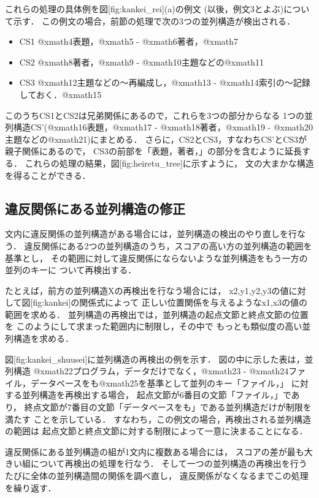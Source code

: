 これらの処理の具体例を図[fig:kankei_rei](a)の例文
(以後，例文3とよぶ)について示す．
この例文の場合，前節の処理で次の3つの並列構造が検出される．
\begin{itemize}
  \item CS1 @xmath4表題，@xmath5 - @xmath6著者，@xmath7
  \item CS2 @xmath8著者，@xmath9 - @xmath10主題などの@xmath11
  \item CS3 @xmath12主題などの〜再編成し，@xmath13 - @xmath14索引の〜記録しておく．@xmath15\
\end{itemize}
このうちCS1とCS2は兄弟関係にあるので，これらを3つの部分からなる
1つの並列構造CS'(@xmath16表題，@xmath17 - @xmath18著者，@xmath19 - @xmath20主題などの@xmath21)にまとめる．
さらに，CS2とCS3，すなわちCS'とCS3が親子関係にあるので，
CS3の前部を「表題，著者，」の部分を含むように延長する．
これらの処理の結果，図[fig:heiretu_tree]に示すように，
文の大まかな構造を得ることができる．

\subsection{違反関係にある並列構造の修正}

文内に違反関係の並列構造がある場合には，並列構造の検出のやり直しを行なう．
違反関係にある2つの並列構造のうち，スコアの高い方の並列構造の範囲を基準とし，
その範囲に対して違反関係にならないような並列構造をもう一方の並列のキーに
ついて再検出する．

{\unitlength=1mm
}

たとえば，前方の並列構造Xの再検出を行なう場合には，
x2,y1,y2,y3の値に対して図[fig:kankei]の関係式によって
正しい位置関係を与えるようなx1,x3の値の範囲を求める．
並列構造の再検出では，並列構造の起点文節と終点文節の位置を
このようにして求まった範囲内に制限し，その中で
もっとも類似度の高い並列構造を求める．

図[fig:kankei_shuusei]に並列構造の再検出の例を示す．
図の中に示した表は，並列構造 @xmath22プログラム，データだけでなく，@xmath23 - 
@xmath24ファイル，データベースをも@xmath25を基準として並列のキー「ファイル，」
に対する並列構造を再検出する場合，
起点文節が6番目の文節「ファイル，」であり，
終点文節が7番目の文節「データベースをも」である並列構造だけが制限を満たす
ことを示している．
すなわち，この例文の場合，再検出される並列構造の範囲は
起点文節と終点文節に対する制限によって一意に決まることになる．

違反関係にある並列構造の組が1文内に複数ある場合には，
スコアの差が最も大きい組について再検出の処理を行なう．
そして一つの並列構造の再検出を行うたびに全体の並列構造間の関係を調べ直し，
違反関係がなくなるまでこの処理を繰り返す．

